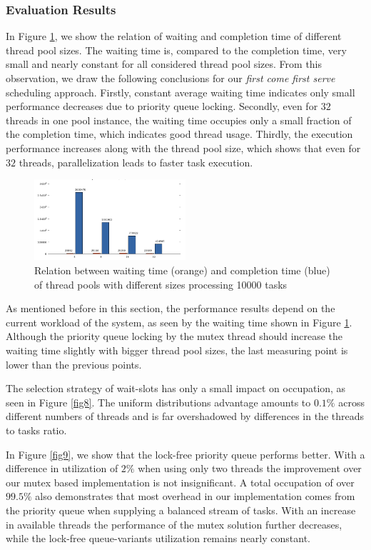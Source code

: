 \documentclass[conference]{IEEEtran}
\begin{document}
\subsubsection{Evaluation Results}
In Figure \ref{fig7}, we show the relation of waiting and completion time of different thread pool sizes. The waiting time is, compared to the completion time, very small and nearly constant for all considered thread pool sizes. From this observation, we draw the following conclusions for our \emph{first come first serve} scheduling approach. Firstly, constant average waiting time indicates only small performance decreases due to priority queue locking. Secondly, even for $32$ threads in one pool instance, the waiting time occupies only a small fraction of the completion time, which indicates good thread usage.  Thirdly, the execution performance increases along with the thread pool size, which shows that even for $32$ threads, parallelization leads to faster task execution. 

\begin{figure}
	\includegraphics[width=0.5\textwidth]{img/pool_avg.png}
	\caption{Relation between waiting time (orange) and completion time (blue) of thread pools with different sizes processing 10000 tasks}
	\label{fig7}
\end{figure}

As mentioned before in this section, the performance results depend on the current workload of the system, as seen by the waiting time shown in Figure \ref{fig7}. Although the priority queue locking by the mutex thread should increase the waiting time slightly with bigger thread pool sizes, the last measuring point is lower than the previous points. 

The selection strategy of wait-slots has only a small impact on occupation, as seen in Figure \ref{fig8}. The uniform distributions advantage amounts to $0.1\%$ across different numbers of threads and is far overshadowed by differences in the threads to tasks ratio.

In Figure \ref{fig9}, we show that the lock-free priority queue performs better. With a difference in utilization of $2\%$ when using only two threads the improvement over our mutex based implementation is not insignificant. A total occupation of over $99.5\%$ also demonstrates that most overhead in our implementation comes from the priority queue when supplying a balanced stream of tasks. With an increase in available threads the performance of the mutex solution further decreases, while the lock-free queue-variants utilization remains nearly constant.
\end{document}
